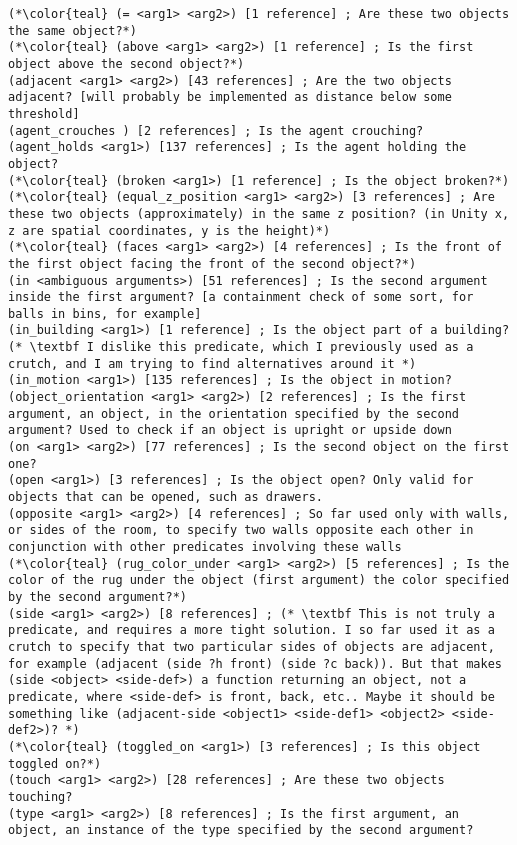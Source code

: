 \documentclass{article}
\begin{document}
\begin{lstlisting}
(*\color{teal} (= <arg1> <arg2>) [1 reference] ; Are these two objects the same object?*)
(*\color{teal} (above <arg1> <arg2>) [1 reference] ; Is the first object above the second object?*)
(adjacent <arg1> <arg2>) [43 references] ; Are the two objects adjacent? [will probably be implemented as distance below some threshold]
(agent_crouches ) [2 references] ; Is the agent crouching?
(agent_holds <arg1>) [137 references] ; Is the agent holding the object?
(*\color{teal} (broken <arg1>) [1 reference] ; Is the object broken?*)
(*\color{teal} (equal_z_position <arg1> <arg2>) [3 references] ; Are these two objects (approximately) in the same z position? (in Unity x, z are spatial coordinates, y is the height)*)
(*\color{teal} (faces <arg1> <arg2>) [4 references] ; Is the front of the first object facing the front of the second object?*)
(in <ambiguous arguments>) [51 references] ; Is the second argument inside the first argument? [a containment check of some sort, for balls in bins, for example]
(in_building <arg1>) [1 reference] ; Is the object part of a building? (* \textbf I dislike this predicate, which I previously used as a crutch, and I am trying to find alternatives around it *)
(in_motion <arg1>) [135 references] ; Is the object in motion?
(object_orientation <arg1> <arg2>) [2 references] ; Is the first argument, an object, in the orientation specified by the second argument? Used to check if an object is upright or upside down
(on <arg1> <arg2>) [77 references] ; Is the second object on the first one?
(open <arg1>) [3 references] ; Is the object open? Only valid for objects that can be opened, such as drawers.
(opposite <arg1> <arg2>) [4 references] ; So far used only with walls, or sides of the room, to specify two walls opposite each other in conjunction with other predicates involving these walls
(*\color{teal} (rug_color_under <arg1> <arg2>) [5 references] ; Is the color of the rug under the object (first argument) the color specified by the second argument?*)
(side <arg1> <arg2>) [8 references] ; (* \textbf This is not truly a predicate, and requires a more tight solution. I so far used it as a crutch to specify that two particular sides of objects are adjacent, for example (adjacent (side ?h front) (side ?c back)). But that makes (side <object> <side-def>) a function returning an object, not a predicate, where <side-def> is front, back, etc.. Maybe it should be something like (adjacent-side <object1> <side-def1> <object2> <side-def2>)? *)
(*\color{teal} (toggled_on <arg1>) [3 references] ; Is this object toggled on?*)
(touch <arg1> <arg2>) [28 references] ; Are these two objects touching?
(type <arg1> <arg2>) [8 references] ; Is the first argument, an object, an instance of the type specified by the second argument?
\end{lstlisting}
\end{document}
